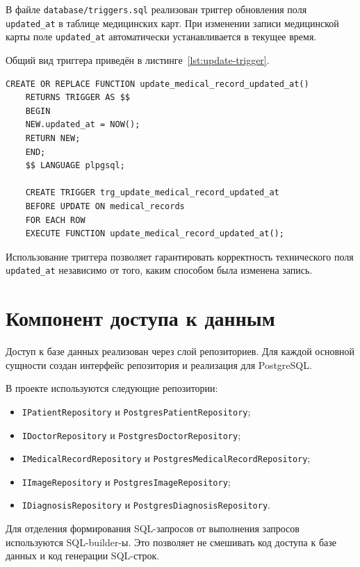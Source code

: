 В файле \texttt{database/triggers.sql} реализован триггер обновления поля \texttt{updated\_at} в таблице медицинских карт. При изменении записи медицинской карты поле \texttt{updated\_at} автоматически устанавливается в текущее время.

Общий вид триггера приведён в листинге~\ref{lst:update-trigger}.

\clearpage

\begin{lstlisting}[caption={Триггер автоматического обновления времени изменения медицинской карты}, label={lst:update-trigger}]
	CREATE OR REPLACE FUNCTION update_medical_record_updated_at()
	RETURNS TRIGGER AS $$
	BEGIN
	NEW.updated_at = NOW();
	RETURN NEW;
	END;
	$$ LANGUAGE plpgsql;
	
	CREATE TRIGGER trg_update_medical_record_updated_at
	BEFORE UPDATE ON medical_records
	FOR EACH ROW
	EXECUTE FUNCTION update_medical_record_updated_at();
\end{lstlisting}

Использование триггера позволяет гарантировать корректность технического поля \texttt{updated\_at} независимо от того, каким способом была изменена запись.

\section{Компонент доступа к данным}

Доступ к базе данных реализован через слой репозиториев. Для каждой основной сущности создан интерфейс репозитория и реализация для PostgreSQL.

В проекте используются следующие репозитории:

\begin{itemize}
	\item \texttt{IPatientRepository} и \texttt{PostgresPatientRepository};
	\item \texttt{IDoctorRepository} и \texttt{PostgresDoctorRepository};
	\item \texttt{IMedicalRecordRepository} и \texttt{PostgresMedicalRecordRepository};
	\item \texttt{IImageRepository} и \texttt{PostgresImageRepository};
	\item \texttt{IDiagnosisRepository} и \texttt{PostgresDiagnosisRepository}.
\end{itemize}

Для отделения формирования SQL-запросов от выполнения запросов используются SQL-builder-ы. Это позволяет не смешивать код доступа к базе данных и код генерации SQL-строк.

